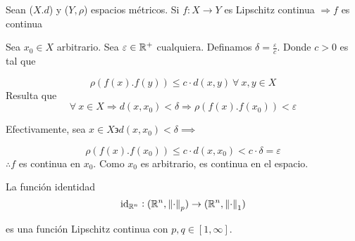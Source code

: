 \begin{corollary} 
    Sean ($X.d$) y ($Y, \rho$) espacios métricos. Si $ f : X \to Y$ es Lipschitz continua $\Rightarrow f$ es continua
\end{corollary}

\begin{orangeproof}
    Sea $x_0 \in X$ arbitrario. Sea $\varepsilon \in \mathbb{R}^+$ cualquiera. Definamos $\delta=\frac{\varepsilon}{c}$. Donde $c>0$ es tal que

    \begin{equation*}
         \rho(f(x).f(y)) \leqslant c \cdot d(x,y) \: \forall \: x,y \in X
    \end{equation*}
    Resulta que
    \begin{equation*}
        \forall \: x \in X \Rightarrow d(x,x_0) < \delta \Rightarrow \rho(f(x). f(x_0)) < \varepsilon
    \end{equation*}

    Efectivamente, sea $x \in X \backepsilon d(x,x_0) < \delta \implies$

    \begin{equation*}
        \rho(f(x). f(x_0)) \leqslant c \cdot d(x,x_0) < c \cdot \delta  = \varepsilon
    \end{equation*}
    $\therefore f$ es continua en $x_0$. Como $x_0$ es arbitrario, es continua en el espacio.
\end{orangeproof} 

\begin{eg}
    La función identidad
    \begin{equation*}
        {\mathrm{id}}_{\mathbb{R}^n} : (\mathbb{R}^n, {\norm{\cdot}}_{p}) \to (\mathbb{R}^n, {\norm{\cdot}}_{1})
    \end{equation*}

    es una función Lipschitz continua con $ p,q \in [1,\infty]$.
\end{eg}

